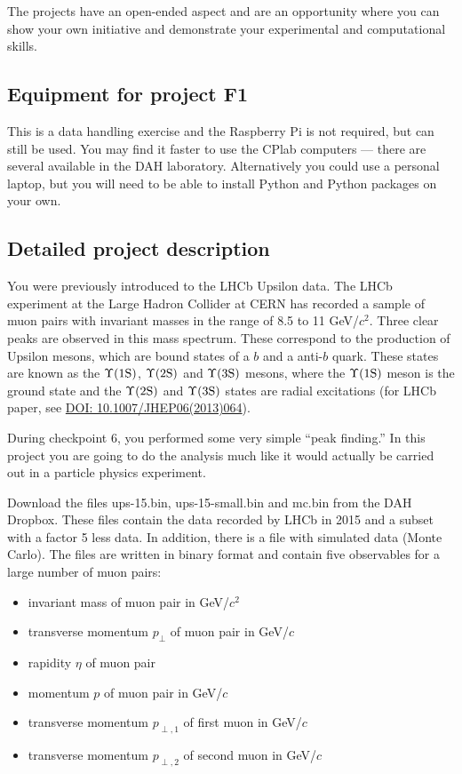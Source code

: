 The projects have an open-ended aspect and are an opportunity where you can show your own initiative and demonstrate your experimental and computational skills. 

\subsection{Equipment for project F1}

This is a data handling exercise and the Raspberry Pi is not required, but can still be used.
You may find it faster to use the CPlab computers --- there are several available in the DAH laboratory.
Alternatively you could use a personal laptop, but you will need to be able to install Python and Python packages on your own.

\subsection{Detailed project description}
  
You were previously introduced to the LHCb Upsilon data. 
The LHCb experiment at the Large Hadron Collider at CERN has recorded a sample of muon pairs with invariant masses in the range of 8.5 to 11 GeV/$c^2$.
Three clear peaks are observed in this mass spectrum.
These correspond to the production of Upsilon mesons, which are bound states of a $b$ and a anti-$b$ quark.
These states are known as the $\Upsilon \rm (1S)$, $\Upsilon \rm (2S)$ and $\Upsilon \rm (3S)$ mesons, where the $\Upsilon \rm (1S)$ meson is the ground state and the $\Upsilon \rm (2S)$ and $\Upsilon \rm (3S)$ states are radial excitations (for LHCb paper, see \href{https://link.springer.com/article/10.1007/JHEP06(2013)064}{DOI: 10.1007/JHEP06(2013)064}).

During checkpoint 6, you performed some very simple ``peak finding.''
In this project you are going to do the analysis much like it would actually be carried out in a particle physics experiment.

\newpage
Download the files ups-15.bin, ups-15-small.bin and mc.bin from the DAH Dropbox.
These files contain the data recorded by LHCb in 2015 and a subset with a factor 5 less data. 
In addition, there is a file with simulated data (Monte Carlo).
The files are written in binary format and contain five observables for a large number of muon pairs:
\begin{itemize}
\item invariant mass of muon pair in GeV/$c^2$
\item transverse momentum $p_\perp$ of muon pair in GeV/$c$
\item rapidity $\eta$ of muon pair
\item momentum $p$ of muon pair in GeV/$c$
\item transverse momentum $p_{\perp,1}$ of first muon in GeV/$c$
\item transverse momentum $p_{\perp,2}$ of second muon in GeV/$c$
\end{itemize}

